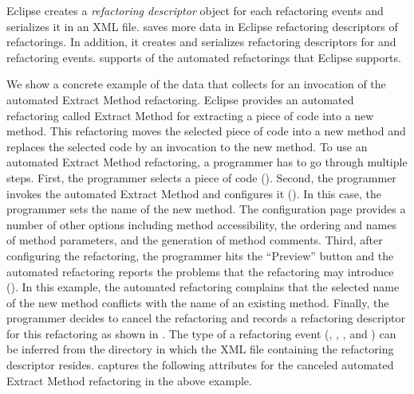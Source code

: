 Eclipse creates a \emph{refactoring descriptor} object for each \Performed{}
refactoring events and serializes it in an XML file. \CodingSpectator{} saves
more data in Eclipse refactoring descriptors of \Performed{} refactorings. In
addition, it creates and serializes refactoring descriptors for \Canceled{} and
\Unavailable{} refactoring events. \CodingSpectator{} supports
 of the
 automated refactorings that Eclipse
supports.

We show a concrete example of the data that \CodingSpectator{} collects for an
invocation of the automated Extract Method refactoring. Eclipse provides an
automated refactoring called Extract Method for extracting a piece of code into
a new method. This refactoring moves the selected piece of code into a new
method and replaces the selected code by an invocation to the new method. To use
an automated Extract Method refactoring, a programmer has to go through multiple
steps. First, the programmer selects a piece of code
(). Second, the
programmer invokes the automated Extract Method and configures it
(). In this case,
the programmer sets the name of the new method. The configuration page provides
a number of other options including method accessibility, the ordering and names
of method parameters, and the generation of method comments. Third, after
configuring the refactoring, the programmer hits the ``Preview'' button and the
automated refactoring reports the problems that the refactoring may introduce
(). In this example, the
automated refactoring complains that the selected name of the new method
conflicts with the name of an existing method. Finally, the programmer decides
to cancel the refactoring and \CodingSpectator{} records a refactoring
descriptor for this \Canceled{} refactoring as shown in
. The type of a refactoring event
(\ie, \Unavailable, \Canceled, and \Performed) can be inferred from the
directory in which the XML file containing the refactoring descriptor resides.
\CodingSpectator{} captures the following attributes for the canceled automated
Extract Method refactoring in the above example.

